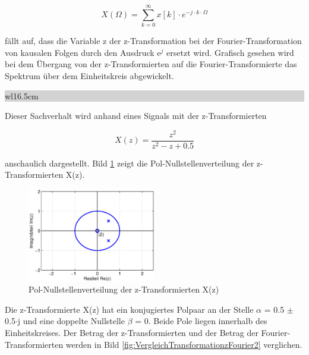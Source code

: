 \begin{equation}\label{eq:sevenonehundredfive}
X\left(\Omega \right)=\sum _{k=0}^{\infty }x\left[k\right]\cdot e^{-j\cdot k\cdot \Omega }
\end{equation}

\noindent f\"{a}llt auf, dass die Variable z der z-Transformation bei der Fourier-Transformation von kausalen Folgen durch den Ausdruck e${}^{j}$ ersetzt wird. Grafisch gesehen wird bei dem \"{U}bergang von der z-Transformierten auf die Fourier-Transformierte das Spektrum \"{u}ber dem Einheitskreis abgewickelt. 

\clearpage

\noindent
\colorbox{lightgray}{%
%
\renewcommand\arraystretch{0.6}%
\begin{tabular}{ wl{16.5cm} }
{\selectfont{Beispiel: Zusammenhang zwischen z-Transformation und Fourier-Transformation von Signalfolgen}}
\end{tabular}%
}\medskip

\noindent Dieser Sachverhalt wird anhand eines Signals mit der z-Transformierten 

\begin{equation}\label{eq:sevenonehundredsix}
X\left(z\right)=\frac{z^{2} }{z^{2} -z+0.5}
\end{equation}

\noindent anschaulich dargestellt. Bild \ref{fig:VergleichTransformationzFourier1} zeigt die Pol-Nullstellenverteilung der z-Transformierten X(z).

\begin{figure}[H]
  \centerline{\includegraphics[width=0.5\textwidth]{Kapitel7/Bilder/image18.eps}}
  \caption{Pol-Nullstellenverteilung der z-Transformierten X(z)}
  \label{fig:VergleichTransformationzFourier1}
\end{figure}

\noindent Die z-Transformierte X(z) hat ein konjugiertes Polpaar an der Stelle $\alpha$ = 0.5 $\mathrm{\pm}$ 0.5$\cdot$j und eine doppelte Nullstelle $\beta$ = 0. Beide Pole liegen innerhalb des  Einheitskreises. Der Betrag der z-Transformierten und der Betrag der Fourier-Transformierten werden in Bild \ref{fig:VergleichTransformationzFourier2} verglichen.

